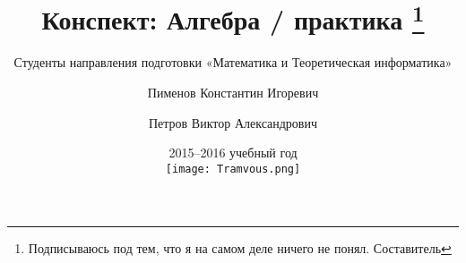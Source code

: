 \documentclass[a4paper,titlepage]{article}
\author{Студенты направления подготовки «Математика и Теоретическая информатика»
  \and Пименов Константин Игоревич
  \and Петров Виктор Александрович}
\title{Конспект: Алгебра / практика
  \thanks{Подписываюсь под тем, что я на самом деле ничего не понял. Составитель}}
\date{2015--2016 учебный год \\ \vspace{1.3cm}
\texttt{[image: Tramvous.png]}}
\begin{document}
\maketitle

\tableofcontents
\vfill\eject










\end{document}
